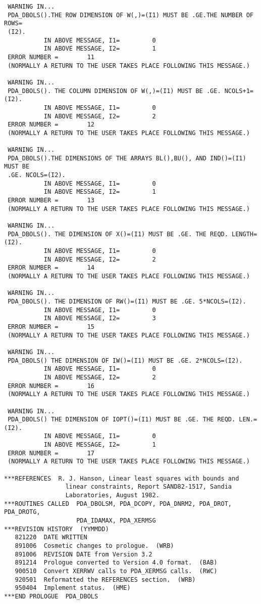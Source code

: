 \begin{verbatim}
 WARNING IN...
 PDA_DBOLS().THE ROW DIMENSION OF W(,)=(I1) MUST BE .GE.THE NUMBER OF ROWS=
 (I2).
           IN ABOVE MESSAGE, I1=         0
           IN ABOVE MESSAGE, I2=         1
 ERROR NUMBER =        11
 (NORMALLY A RETURN TO THE USER TAKES PLACE FOLLOWING THIS MESSAGE.)

 WARNING IN...
 PDA_DBOLS(). THE COLUMN DIMENSION OF W(,)=(I1) MUST BE .GE. NCOLS+1=(I2).
           IN ABOVE MESSAGE, I1=         0
           IN ABOVE MESSAGE, I2=         2
 ERROR NUMBER =        12
 (NORMALLY A RETURN TO THE USER TAKES PLACE FOLLOWING THIS MESSAGE.)

 WARNING IN...
 PDA_DBOLS().THE DIMENSIONS OF THE ARRAYS BL(),BU(), AND IND()=(I1) MUST BE
 .GE. NCOLS=(I2).
           IN ABOVE MESSAGE, I1=         0
           IN ABOVE MESSAGE, I2=         1
 ERROR NUMBER =        13
 (NORMALLY A RETURN TO THE USER TAKES PLACE FOLLOWING THIS MESSAGE.)

 WARNING IN...
 PDA_DBOLS(). THE DIMENSION OF X()=(I1) MUST BE .GE. THE REQD. LENGTH=(I2).
           IN ABOVE MESSAGE, I1=         0
           IN ABOVE MESSAGE, I2=         2
 ERROR NUMBER =        14
 (NORMALLY A RETURN TO THE USER TAKES PLACE FOLLOWING THIS MESSAGE.)

 WARNING IN...
 PDA_DBOLS(). THE DIMENSION OF RW()=(I1) MUST BE .GE. 5*NCOLS=(I2).
           IN ABOVE MESSAGE, I1=         0
           IN ABOVE MESSAGE, I2=         3
 ERROR NUMBER =        15
 (NORMALLY A RETURN TO THE USER TAKES PLACE FOLLOWING THIS MESSAGE.)

 WARNING IN...
 PDA_DBOLS() THE DIMENSION OF IW()=(I1) MUST BE .GE. 2*NCOLS=(I2).
           IN ABOVE MESSAGE, I1=         0
           IN ABOVE MESSAGE, I2=         2
 ERROR NUMBER =        16
 (NORMALLY A RETURN TO THE USER TAKES PLACE FOLLOWING THIS MESSAGE.)

 WARNING IN...
 PDA_DBOLS() THE DIMENSION OF IOPT()=(I1) MUST BE .GE. THE REQD. LEN.=(I2).
           IN ABOVE MESSAGE, I1=         0
           IN ABOVE MESSAGE, I2=         1
 ERROR NUMBER =        17
 (NORMALLY A RETURN TO THE USER TAKES PLACE FOLLOWING THIS MESSAGE.)

***REFERENCES  R. J. Hanson, Linear least squares with bounds and
                 linear constraints, Report SAND82-1517, Sandia
                 Laboratories, August 1982.
***ROUTINES CALLED  PDA_DBOLSM, PDA_DCOPY, PDA_DNRM2, PDA_DROT, PDA_DROTG,
                    PDA_IDAMAX, PDA_XERMSG
***REVISION HISTORY  (YYMMDD)
   821220  DATE WRITTEN
   891006  Cosmetic changes to prologue.  (WRB)
   891006  REVISION DATE from Version 3.2
   891214  Prologue converted to Version 4.0 format.  (BAB)
   900510  Convert XERRWV calls to PDA_XERMSG calls.  (RWC)
   920501  Reformatted the REFERENCES section.  (WRB)
   950404  Implement status.  (HME)
***END PROLOGUE  PDA_DBOLS
\end{verbatim}


